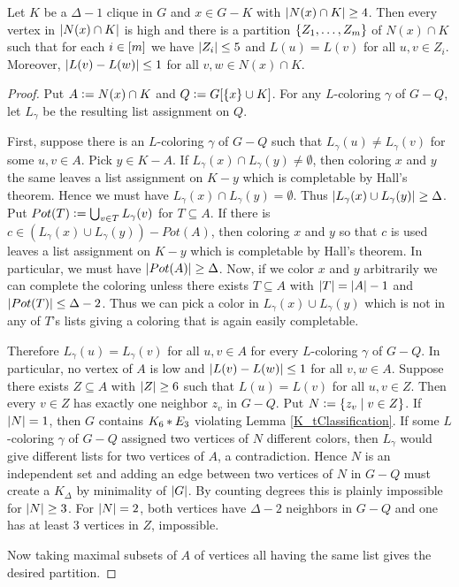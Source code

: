 \begin{lem}\label{clumping}
Let $K$ be a $\Delta-1$ clique in $G$ and $x \in G - K$ with $\left|N(x) \cap
K\right| \geq 4$.  Then every vertex in $\left|N(x) \cap
K\right|$ is high and there is a partition $\left\{ Z_1, \ldots, Z_m \right\}$
of $N(x) \cap K$ such that for each $i \in \left[m\right]$ we have $\left|Z_i\right| \leq
5$ and $L(u) = L(v)$ for all $u, v \in Z_i$.  Moreover, $\left|L(v) - L(w)\right|
\leq 1$ for all $v, w \in N(x) \cap K$.
\end{lem}
\begin{proof}
Put $A \mathrel{\mathop:}= N(x) \cap K$ and $Q \mathrel{\mathop:}= G[\left\{ x \right\} \cup K]$.  For any
$L$-coloring $\gamma$ of $G - Q$, let $L_\gamma$ be the resulting list
assignment on $Q$.

First, suppose there is an $L$-coloring $\gamma$ of $G - Q$ such that
$L_\gamma(u) \neq L_\gamma(v)$ for some $u, v \in A$.  Pick $y \in K - A$.  If
$L_\gamma(x) \cap L_\gamma(y) \neq \emptyset$, then coloring $x$ and $y$ the
same leaves a list assignment on $K - y$  which is completable by Hall's theorem.
Hence we must have $L_\gamma(x) \cap L_\gamma(y) = \emptyset$.  Thus $\left|L_\gamma(x) \cup L_\gamma(y)\right| \geq \Delta$.  Put $Pot(T) \mathrel{\mathop:}= \bigcup_{v \in T} L_\gamma(v)$ for $T \subseteq A$.  If there is $c \in (L_\gamma(x) \cup L_\gamma(y)) - Pot(A)$, then coloring $x$ and $y$ so that $c$ is used leaves a list assignment on $K-y$ which is completable by Hall's theorem.  In particular, we must have $\left|Pot(A)\right| \geq \Delta$. Now, if we color $x$ and $y$ arbitrarily we can complete the coloring unless there exists $T \subseteq A$ with $\left|T\right| = \left|A\right|-1$ and $\left|Pot(T)\right| \leq \Delta - 2$.  Thus we can pick a color in $L_\gamma(x) \cup L_\gamma(y)$ which is not in any of $T$'s lists giving a coloring that is again easily completable.

Therefore $L_\gamma(u) = L_\gamma(v)$ for all $u, v \in A$ for every
$L$-coloring $\gamma$ of $G - Q$.  In particular, no vertex of $A$ is
low and $\left|L(v) - L(w)\right| \leq 1$ for all $v, w \in A$.  Suppose there exists
$Z \subseteq A$ with $\left|Z\right| \geq 6$ such that $L(u) = L(v)$ for all $u, v \in Z$.  Then every $v
\in Z$ has exactly one neighbor $z_v$ in $G-Q$.  Put $N \mathrel{\mathop:}=
\left\{ z_v \mid v \in Z \right\}$.  If $\left|N\right| = 1$, then $G$ contains $K_6 \mbox{\hspace{2 pt}$\ast$\hspace{2 pt}} E_3$
violating Lemma \ref{K_tClassification}.  If some $L$-coloring $\gamma$ of $G-Q$ assigned
two vertices of $N$ different colors, then $L_\gamma$ would give different lists
for two vertices of $A$, a contradiction.  Hence $N$ is an independent set and
adding an edge between two vertices of $N$ in $G-Q$ must create a $K_\Delta$ by
minimality of $\left|G\right|$.  By counting degrees this is plainly impossible for
$\left|N\right| \geq 3$.  For $\left|N\right| = 2$, both vertices have $\Delta-2$ neighbors
in $G-Q$ and one has at least $3$ vertices in $Z$, impossible.

Now taking maximal subsets of $A$ of vertices all having the same list gives the
desired partition.
\end{proof}

